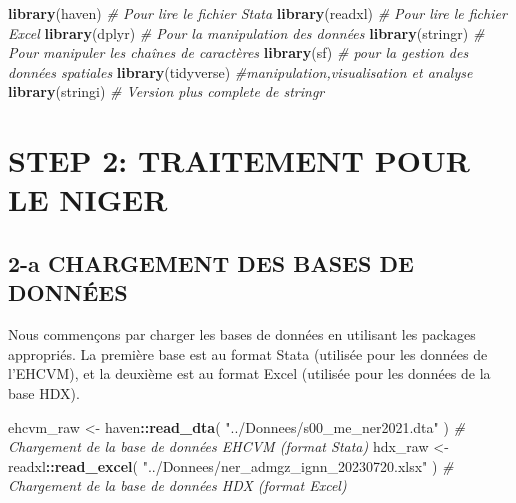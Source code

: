 \documentclass[
]{article}
\newenvironment{Shaded}{\begin{snugshade}}{\end{snugshade}}
\newcommand{\CommentTok}[1]{\textcolor[rgb]{0.56,0.35,0.01}{\textit{#1}}}
\newcommand{\FunctionTok}[1]{\textcolor[rgb]{0.13,0.29,0.53}{\textbf{#1}}}
\newcommand{\NormalTok}[1]{#1}
\newcommand{\OtherTok}[1]{\textcolor[rgb]{0.56,0.35,0.01}{#1}}
\newcommand{\SpecialCharTok}[1]{\textcolor[rgb]{0.81,0.36,0.00}{\textbf{#1}}}
\newcommand{\StringTok}[1]{\textcolor[rgb]{0.31,0.60,0.02}{#1}}
\begin{document}
\begin{Shaded}
\begin{Highlighting}[]
\FunctionTok{library}\NormalTok{(haven)    }\CommentTok{\# Pour lire le fichier Stata}
\FunctionTok{library}\NormalTok{(readxl)   }\CommentTok{\# Pour lire le fichier Excel}
\FunctionTok{library}\NormalTok{(dplyr)    }\CommentTok{\# Pour la manipulation des données}
\FunctionTok{library}\NormalTok{(stringr)  }\CommentTok{\# Pour manipuler les chaînes de caractères}
\FunctionTok{library}\NormalTok{(sf) }\CommentTok{\# pour la gestion des données spatiales }
\FunctionTok{library}\NormalTok{(tidyverse) }\CommentTok{\#manipulation,visualisation et analyse }
\FunctionTok{library}\NormalTok{(stringi) }\CommentTok{\# Version plus complete de stringr}
\end{Highlighting}
\end{Shaded}

\newpage
{}
\section*{\centering \Huge  STEP 2: TRAITEMENT POUR LE NIGER}

\subsection{2-a CHARGEMENT DES BASES DE
DONNÉES}\label{a-chargement-des-bases-de-donnuxe9es}

Nous commençons par charger les bases de données en utilisant les
packages appropriés. La première base est au format Stata (utilisée pour
les données de l'EHCVM), et la deuxième est au format Excel (utilisée
pour les données de la base HDX).

\begin{Shaded}
\begin{Highlighting}[]
\NormalTok{ehcvm\_raw }\OtherTok{\textless{}{-}}\NormalTok{ haven}\SpecialCharTok{::}\FunctionTok{read\_dta}\NormalTok{(}
  \StringTok{"../Donnees/s00\_me\_ner2021.dta"}
\NormalTok{  )  }\CommentTok{\# Chargement de la base de données EHCVM (format Stata)}
\NormalTok{hdx\_raw }\OtherTok{\textless{}{-}}\NormalTok{ readxl}\SpecialCharTok{::}\FunctionTok{read\_excel}\NormalTok{(}
  \StringTok{"../Donnees/ner\_admgz\_ignn\_20230720.xlsx"}
\NormalTok{  ) }\CommentTok{\# Chargement de la base de données HDX (format Excel)}
\end{Highlighting}
\end{Shaded}
\end{document}
